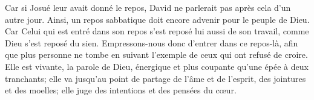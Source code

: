 Car si Josué leur avait donné le repos,
	David ne parlerait pas après cela d’un autre jour.
Ainsi, un repos sabbatique doit encore advenir pour le peuple de Dieu.
Car Celui qui est entré dans son repos s’est reposé lui aussi de son travail,
	comme Dieu s’est reposé du sien.
Empressons-nous donc d’entrer dans ce repos-là,
	afin que plus personne ne tombe en suivant l’exemple de ceux qui ont refusé de croire.
Elle est vivante, la parole de Dieu,
	énergique et plus coupante qu’une épée à deux tranchants;
	elle va jusqu’au point de partage de l’âme et de l’esprit,
	des jointures et des moelles;
	elle juge des intentions et des pensées du cœur.
